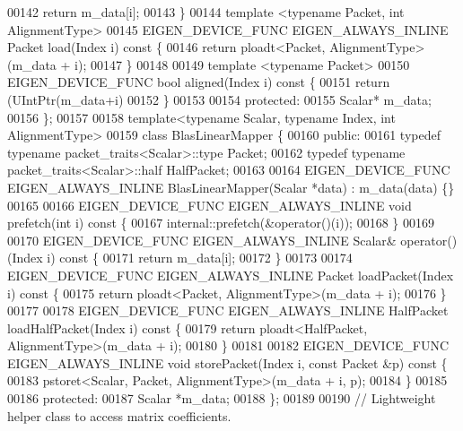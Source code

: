 \begin{DoxyCode}
00142     \textcolor{keywordflow}{return} m\_data[i];
00143   \}
00144   \textcolor{keyword}{template} <\textcolor{keyword}{typename} Packet, \textcolor{keywordtype}{int} AlignmentType>
00145   EIGEN\_DEVICE\_FUNC EIGEN\_ALWAYS\_INLINE Packet load(Index i)\textcolor{keyword}{ const }\{
00146     \textcolor{keywordflow}{return} ploadt<Packet, AlignmentType>(m\_data + i);
00147   \}
00148 
00149   \textcolor{keyword}{template} <\textcolor{keyword}{typename} Packet>
00150   EIGEN\_DEVICE\_FUNC \textcolor{keywordtype}{bool} aligned(Index i)\textcolor{keyword}{ const }\{
00151     \textcolor{keywordflow}{return} (UIntPtr(m\_data+i)%
00152   \}
00153 
00154   \textcolor{keyword}{protected}:
00155   Scalar* m\_data;
00156 \};
00157 
00158 \textcolor{keyword}{template}<\textcolor{keyword}{typename} Scalar, \textcolor{keyword}{typename} Index, \textcolor{keywordtype}{int} AlignmentType>
00159 \textcolor{keyword}{class }BlasLinearMapper \{
00160   \textcolor{keyword}{public}:
00161   \textcolor{keyword}{typedef} \textcolor{keyword}{typename} packet\_traits<Scalar>::type Packet;
00162   \textcolor{keyword}{typedef} \textcolor{keyword}{typename} packet\_traits<Scalar>::half HalfPacket;
00163 
00164   EIGEN\_DEVICE\_FUNC EIGEN\_ALWAYS\_INLINE BlasLinearMapper(Scalar *data) : m\_data(data) \{\}
00165 
00166   EIGEN\_DEVICE\_FUNC EIGEN\_ALWAYS\_INLINE \textcolor{keywordtype}{void} prefetch(\textcolor{keywordtype}{int} i)\textcolor{keyword}{ const }\{
00167     internal::prefetch(&\textcolor{keyword}{operator}()(i));
00168   \}
00169 
00170   EIGEN\_DEVICE\_FUNC EIGEN\_ALWAYS\_INLINE Scalar& operator()(Index i)\textcolor{keyword}{ const }\{
00171     \textcolor{keywordflow}{return} m\_data[i];
00172   \}
00173 
00174   EIGEN\_DEVICE\_FUNC EIGEN\_ALWAYS\_INLINE Packet loadPacket(Index i)\textcolor{keyword}{ const }\{
00175     \textcolor{keywordflow}{return} ploadt<Packet, AlignmentType>(m\_data + i);
00176   \}
00177 
00178   EIGEN\_DEVICE\_FUNC EIGEN\_ALWAYS\_INLINE HalfPacket loadHalfPacket(Index i)\textcolor{keyword}{ const }\{
00179     \textcolor{keywordflow}{return} ploadt<HalfPacket, AlignmentType>(m\_data + i);
00180   \}
00181 
00182   EIGEN\_DEVICE\_FUNC EIGEN\_ALWAYS\_INLINE \textcolor{keywordtype}{void} storePacket(Index i, \textcolor{keyword}{const} Packet &p)\textcolor{keyword}{ const }\{
00183     pstoret<Scalar, Packet, AlignmentType>(m\_data + i, p);
00184   \}
00185 
00186   \textcolor{keyword}{protected}:
00187   Scalar *m\_data;
00188 \};
00189 
00190 \textcolor{comment}{// Lightweight helper class to access matrix coefficients.}

\end{DoxyCode}

